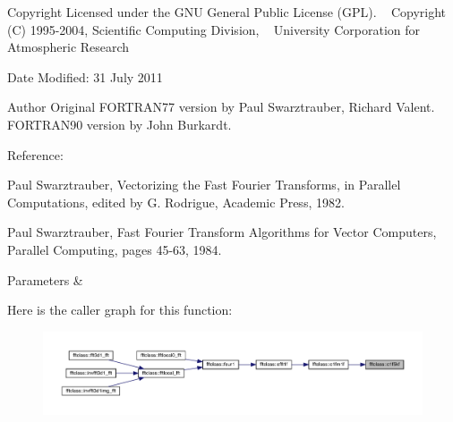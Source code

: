 \begin{DoxyCopyright}{Copyright}
Licensed under the G\+NU General Public License (G\+PL). ~\newline
 Copyright (C) 1995-\/2004, Scientific Computing Division, ~\newline
 University Corporation for Atmospheric Research 
\end{DoxyCopyright}
\begin{DoxyDate}{Date}
Modified\+: 31 July 2011 
\end{DoxyDate}
\begin{DoxyAuthor}{Author}
Original F\+O\+R\+T\+R\+A\+N77 version by Paul Swarztrauber, Richard Valent. ~\newline
 F\+O\+R\+T\+R\+A\+N90 version by John Burkardt.
\end{DoxyAuthor}
\begin{DoxyVerb}  Reference:

    Paul Swarztrauber,
    Vectorizing the Fast Fourier Transforms,
    in Parallel Computations,
    edited by G. Rodrigue,
    Academic Press, 1982.

    Paul Swarztrauber,
    Fast Fourier Transform Algorithms for Vector Computers,
    Parallel Computing, pages 45-63, 1984.\end{DoxyVerb}
 
\begin{DoxyParams}{Parameters}
{\em } & \\
\hline
\end{DoxyParams}
Here is the caller graph for this function\+:\nopagebreak
\begin{figure}[H]
\begin{center}
\leavevmode
\includegraphics[width=350pt]{namespacefftclass_a21d2647f4c2392ed5498288f99a3203c_icgraph}
\end{center}
\end{figure}
\mbox{\label{namespacefftclass_ac9b19ae24fcc92a08a29696cf60fd412}} 
